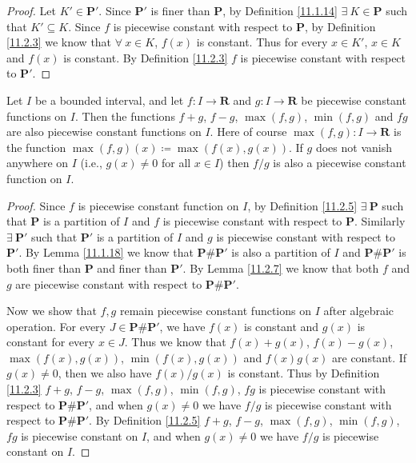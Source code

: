 \begin{proof}
    Let \(K' \in \mathbf{P}'\).
    Since \(\mathbf{P}'\) is finer than \(\mathbf{P}\), by Definition \ref{11.1.14} \(\exists\ K \in \mathbf{P}\) such that \(K' \subseteq K\).
    Since \(f\) is piecewise constant with respect to \(\mathbf{P}\), by Definition \ref{11.2.3} we know that \(\forall\ x \in K\), \(f(x)\) is constant.
    Thus for every \(x \in K'\), \(x \in K\) and \(f(x)\) is constant.
    By Definition \ref{11.2.3} \(f\) is piecewise constant with respect to \(\mathbf{P}'\).
\end{proof}

\begin{lemma}\label{11.2.8}
    Let \(I\) be a bounded interval, and let \(f : I \to \mathbf{R}\) and \(g : I \to \mathbf{R}\) be piecewise constant functions on \(I\).
    Then the functions \(f + g\), \(f - g\), \(\max(f, g)\), \(\min(f, g)\) and \(fg\) are also piecewise constant functions on \(I\).
    Here of course \(\max(f, g) : I \to \mathbf{R}\) is the function \(\max(f, g)(x) \coloneqq \max(f(x), g(x))\).
    If \(g\) does not vanish anywhere on \(I\) (i.e., \(g(x) \neq 0\) for all \(x \in I\)) then \(f / g\) is also a piecewise constant function on \(I\).
\end{lemma}

\begin{proof}
    Since \(f\) is piecewise constant function on \(I\), by Definition \ref{11.2.5} \(\exists\ \mathbf{P}\) such that \(\mathbf{P}\) is a partition of \(I\) and \(f\) is piecewise constant with respect to \(\mathbf{P}\).
    Similarly \(\exists\ \mathbf{P}'\) such that \(\mathbf{P}'\) is a partition of \(I\) and \(g\) is piecewise constant with respect to \(\mathbf{P}'\).
    By Lemma \ref{11.1.18} we know that \(\mathbf{P} \# \mathbf{P}'\) is also a partition of \(I\) and \(\mathbf{P} \# \mathbf{P}'\) is both finer than \(\mathbf{P}\) and finer than \(\mathbf{P}'\).
    By Lemma \ref{11.2.7} we know that both \(f\) and \(g\) are piecewise constant with respect to \(\mathbf{P} \# \mathbf{P}'\).

    Now we show that \(f, g\) remain piecewise constant functions on \(I\) after algebraic operation.
    For every \(J \in \mathbf{P} \# \mathbf{P}'\), we have \(f(x)\) is constant and \(g(x)\) is constant for every \(x \in J\).
    Thus we know that \(f(x) + g(x)\), \(f(x) - g(x)\), \(\max(f(x), g(x))\), \(\min(f(x), g(x))\) and \(f(x) g(x)\) are constant.
    If \(g(x) \neq 0\), then we also have \(f(x) / g(x)\) is constant.
    Thus by Definition \ref{11.2.3} \(f + g\), \(f - g\), \(\max(f, g)\), \(\min(f, g)\), \(fg\) is piecewise constant with respect to \(\mathbf{P} \# \mathbf{P}'\), and when \(g(x) \neq 0\) we have \(f / g\) is piecewise constant with respect to \(\mathbf{P} \# \mathbf{P}'\).
    By Definition \ref{11.2.5} \(f + g\), \(f - g\), \(\max(f, g)\), \(\min(f, g)\), \(fg\) is piecewise constant on \(I\), and when \(g(x) \neq 0\) we have \(f / g\) is piecewise constant on \(I\).
\end{proof}

